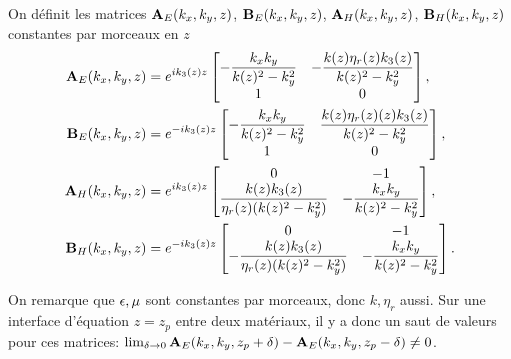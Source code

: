       \begin{defn}
        On définit les matrices \(\mathbf{A}_{E}(k_x,k_y,z)\), \(\mathbf{B}_{E}(k_x,k_y,z)\), \(\mathbf{A}_{H}(k_x,k_y,z)\), \(\mathbf{B}_{H}(k_x,k_y,z)\) constantes par morceaux en \(z\)
        \begin{align*}
          \mathbf{A}_{E}(k_x,k_y,z) &= e^{ik_3(z)z}
          \begin{bmatrix}
            -\dfrac{k_xk_y}{k(z)^2 - k_y^2} & -\dfrac{k(z)\eta_r(z)k_3(z)}{k(z)^2 - k_y^2}
            \\
            1 & 0
          \end{bmatrix},
          \\
          \mathbf{B}_{E}(k_x,k_y,z) &= e^{-ik_3(z)z}
          \begin{bmatrix}
            -\dfrac{k_xk_y}{k(z)^2 - k_y^2} & \dfrac{k(z)\eta_r(z)(z) k_3(z)}{k(z)^2 - k_y^2}
            \\
            1 & 0
          \end{bmatrix},
          \\
          \mathbf{A}_{H}(k_x,k_y,z) &= e^{ik_3(z)z}
          \begin{bmatrix}
            0 & -1
            \\
            \dfrac{k(z)k_3(z)}{\eta_r(z)(k(z)^2 - k_y^2)} & -\dfrac{k_xk_y}{k(z)^2 - k_y^2}
          \end{bmatrix},
          \\
          \mathbf{B}_{H}(k_x,k_y,z) &= e^{-ik_3(z)z}
          \begin{bmatrix}
            0 & -1
            \\
            -\dfrac{k(z)k_3(z)}{\eta_r(z)(k(z)^2 - k_y^2)} & -\dfrac{k_xk_y}{k(z)^2 - k_y^2}
          \end{bmatrix}.
        \end{align*}
      \end{defn}
      On remarque que \(\epsilon,\mu\) sont constantes par morceaux, donc \(k,\eta_r\) aussi.
      Sur une interface d'équation \(z=z_p\) entre deux matériaux, il y a donc un saut de valeurs pour ces matrices: \(\lim_{\delta\rightarrow 0 } \mathbf{A}_E(k_x,k_y,z_p+ \delta) - \mathbf{A}_E(k_x,k_y,z_p - \delta) \not = 0\).
